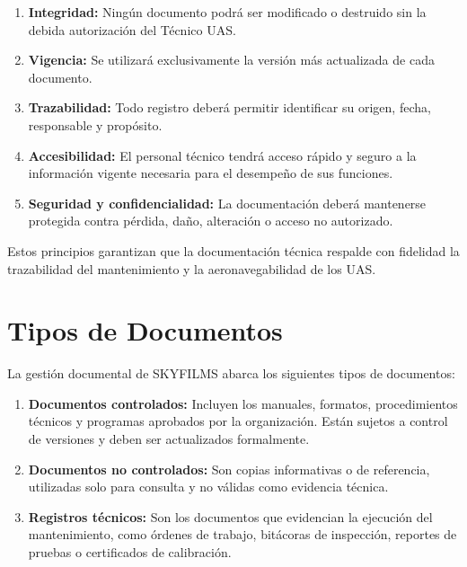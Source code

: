 \begin{enumerate}
    \item \textbf{Integridad:} Ningún documento podrá ser modificado o destruido sin la debida autorización del Técnico UAS.

    \item \textbf{Vigencia:} Se utilizará exclusivamente la versión más actualizada de cada documento.

    \item \textbf{Trazabilidad:} Todo registro deberá permitir identificar su origen, fecha, responsable y propósito.

    \item \textbf{Accesibilidad:} El personal técnico tendrá acceso rápido y seguro a la información vigente necesaria para el desempeño de sus funciones.

    \item \textbf{Seguridad y confidencialidad:} La documentación deberá mantenerse protegida contra pérdida, daño, alteración o acceso no autorizado.
\end{enumerate}

Estos principios garantizan que la documentación técnica respalde con fidelidad la trazabilidad del mantenimiento y la aeronavegabilidad de los UAS.

\section{Tipos de Documentos}
La gestión documental de SKYFILMS abarca los siguientes tipos de documentos:

\begin{enumerate}
    \item \textbf{Documentos controlados:} Incluyen los manuales, formatos, procedimientos técnicos y programas aprobados por la organización. Están sujetos a control de versiones y deben ser actualizados formalmente.

    \item \textbf{Documentos no controlados:} Son copias informativas o de referencia, utilizadas solo para consulta y no válidas como evidencia técnica.

    \item \textbf{Registros técnicos:} Son los documentos que evidencian la ejecución del mantenimiento, como órdenes de trabajo, bitácoras de inspección, reportes de pruebas o certificados de calibración.
\end{enumerate}


